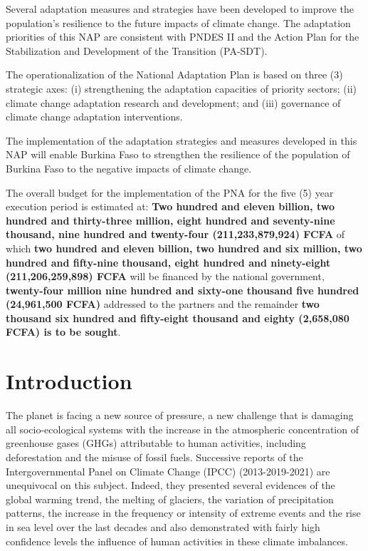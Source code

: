 \documentclass[
]{book}
\begin{document}
Several adaptation measures and strategies have been developed to improve the population's resilience to the future impacts of climate change. The adaptation priorities of this NAP are consistent with PNDES II and the Action Plan for the Stabilization and Development of the Transition (PA-SDT).

The operationalization of the National Adaptation Plan is based on three (3) strategic axes: (i) strengthening the adaptation capacities of priority sectors; (ii) climate change adaptation research and development; and (iii) governance of climate change adaptation interventions.

The implementation of the adaptation strategies and measures developed in this NAP will enable Burkina Faso to strengthen the resilience of the population of Burkina Faso to the negative impacts of climate change.

The overall budget for the implementation of the PNA for the five (5) year execution period is estimated at: \textbf{Two hundred and eleven billion, two hundred and thirty-three million, eight hundred and seventy-nine thousand, nine hundred and twenty-four (211,233,879,924) FCFA} of which \textbf{two hundred and eleven billion, two hundred and six million, two hundred and fifty-nine thousand, eight hundred and ninety-eight (211,206,259,898) FCFA} will be financed by the national government, \textbf{twenty-four million nine hundred and sixty-one thousand five hundred (24,961,500 FCFA)} addressed to the partners and the remainder \textbf{two thousand six hundred and fifty-eight thousand and eighty (2,658,080 FCFA) is to be sought}.

\chapter{Introduction}\label{introduction}

The planet is facing a new source of pressure, a new challenge that is damaging all socio-ecological systems with the increase in the atmospheric concentration of greenhouse gases (GHGs) attributable to human activities, including deforestation and the misuse of fossil fuels. Successive reports of the Intergovernmental Panel on Climate Change (IPCC) (2013-2019-2021) are unequivocal on this subject. Indeed, they presented several evidences of the global warming trend, the melting of glaciers, the variation of precipitation patterns, the increase in the frequency or intensity of extreme events and the rise in sea level over the last decades and also demonstrated with fairly high confidence levels the influence of human activities in these climate imbalances.
\end{document}

